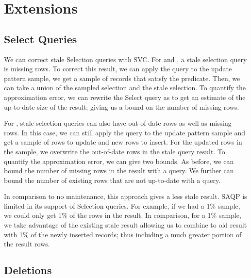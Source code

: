 \section{Extensions}
\subsection{Select Queries}\label{sec:sel}
We can correct stale Selection queries with SVC.
For \fjview and \spview, a stale selection query is missing rows.
To correct this result, we can apply the query to the update pattern sample, we get a sample of records that satisfy the predicate.
Then, we can take a union of the sampled selection and the stale selection.
To quantify the approximation error, we can rewrite the Select query as \countfunc to get an estimate of the up-to-date size of the result; giving us a bound on the number of missing rows.

For \aggview, stale selection queries can also have out-of-date rows as well as missing rows.
In this case, we can still apply the query to the update pattern sample and get a sample of rows to update and new rows to insert.
For the updated rows in the sample, we overwrite the out-of-date rows in the stale query result.
To quantify the approximation error, we can give two bounds.
As before, we can bound the number of missing rows in the result with a \countfunc query.
We further can bound the number of existing rows that are not up-to-date with a \countfunc query.

In comparison to no maintenance, this approach gives a less stale result.
SAQP is limited in its support of Selection queries.
For example, if we had a 1\% sample, we could only get 1\% of the rows in the result.
In comparison, for a 1\% sample, we take advantage of the existing stale result allowing us to combine to old result with 1\% of the newly inserted records; thus including a much greater portion of the result rows.

\subsection{Deletions}\label{sec:del}
